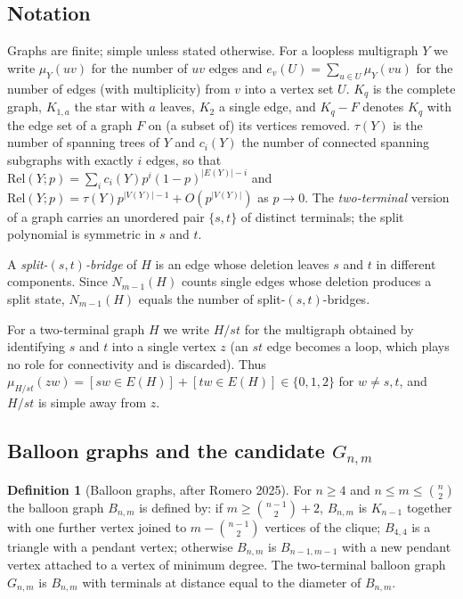 \documentclass[
  11pt,
]{article}
\theoremstyle{definition}
\newtheorem{definition}[theorem]{Definition}
\theoremstyle{remark}
\begin{document}
\subsection{Notation}\label{notation}

Graphs are finite; simple unless stated otherwise. For a loopless
multigraph \(Y\) we write \(\mu_Y(uv)\) for the number of \(uv\) edges
and \(e_v(U)=\sum_{u\in U}\mu_Y(vu)\) for the number of edges (with
multiplicity) from \(v\) into a vertex set \(U\). \(K_q\) is the
complete graph, \(K_{1,a}\) the star with \(a\) leaves, \(K_2\) a single
edge, and \(K_q-F\) denotes \(K_q\) with the edge set of a graph \(F\)
on (a subset of) its vertices removed. \(\tau(Y)\) is the number of
spanning trees of \(Y\) and \(c_i(Y)\) the number of connected spanning
subgraphs with exactly \(i\) edges, so that
\(\mathrm{Rel}(Y;p)=\sum_i c_i(Y)p^i(1-p)^{|E(Y)|-i}\) and
\(\mathrm{Rel}(Y;p)=\tau(Y)p^{|V(Y)|-1}+O(p^{|V(Y)|})\) as \(p\to 0\).
The \emph{two-terminal} version of a graph carries an unordered pair
\(\{s,t\}\) of distinct terminals; the split polynomial is symmetric in
\(s\) and \(t\).

A \emph{split-\((s,t)\)-bridge} of \(H\) is an edge whose deletion
leaves \(s\) and \(t\) in different components. Since \(N_{m-1}(H)\)
counts single edges whose deletion produces a split state,
\(N_{m-1}(H)\) equals the number of split-\((s,t)\)-bridges.

For a two-terminal graph \(H\) we write \(H/st\) for the multigraph
obtained by identifying \(s\) and \(t\) into a single vertex \(z\) (an
\(st\) edge becomes a loop, which plays no role for connectivity and is
discarded). Thus
\(\mu_{H/st}(zw)=[sw\in E(H)]+[tw\in E(H)]\in\{0,1,2\}\) for
\(w\ne s,t\), and \(H/st\) is simple away from \(z\).

\subsection{\texorpdfstring{Balloon graphs and the candidate
\(G_{n,m}\)}{Balloon graphs and the candidate G\_\{n,m\}}}\label{balloon-graphs-and-the-candidate-g_nm}

\begin{definition}[Balloon graphs, after Romero 2025]\label{def:balloon}
For $n\ge 4$ and $n\le m\le\binom n2$ the balloon graph $B_{n,m}$ is defined by: if $m\ge\binom{n-1}2+2$, $B_{n,m}$ is $K_{n-1}$ together with one further vertex joined to $m-\binom{n-1}2$ vertices of the clique; $B_{4,4}$ is a triangle with a pendant vertex; otherwise $B_{n,m}$ is $B_{n-1,m-1}$ with a new pendant vertex attached to a vertex of minimum degree. The two-terminal balloon graph $G_{n,m}$ is $B_{n,m}$ with terminals at distance equal to the diameter of $B_{n,m}$.
\end{definition}
\end{document}
